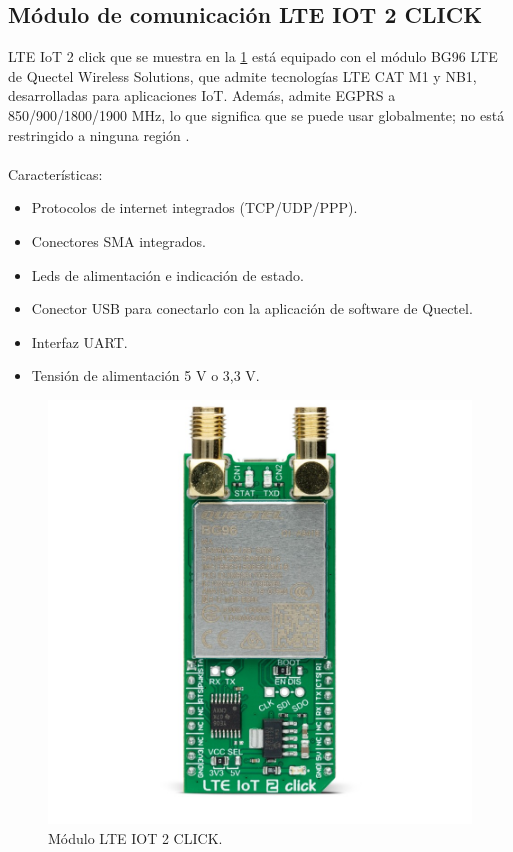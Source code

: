 \subsection{Módulo de comunicación LTE IOT 2 CLICK}
\label{subsec:ejemplo}
LTE IoT 2 click que se muestra en la \ref{fig:modulo LTE IOT} está equipado con el módulo BG96 LTE de Quectel Wireless Solutions, que admite tecnologías LTE CAT M1 y NB1, desarrolladas para aplicaciones IoT. Además, admite EGPRS a 850/900/1800/1900 MHz, lo que significa que se puede usar globalmente; no está restringido a ninguna región \citep{MonuloLTE-IOT}.
\\ 
\\Características:
\begin{itemize}
	\item Protocolos de internet integrados (TCP/UDP/PPP).
	\item Conectores SMA integrados.
	\item Leds de alimentación e indicación de estado.
	\item Conector USB para conectarlo con la aplicación de software de Quectel.
	\item Interfaz UART. 
	\item Tensión de alimentación 5 V o 3,3 V.
\end{itemize}
\begin{figure}[htbp]
	\centering
	\includegraphics[width=.4\textwidth]{./Figures/moduloBG96.jpg}
	\caption{Módulo LTE IOT 2 CLICK\protect\footnotemark.}
	\label{fig:modulo LTE IOT}
\end{figure}

